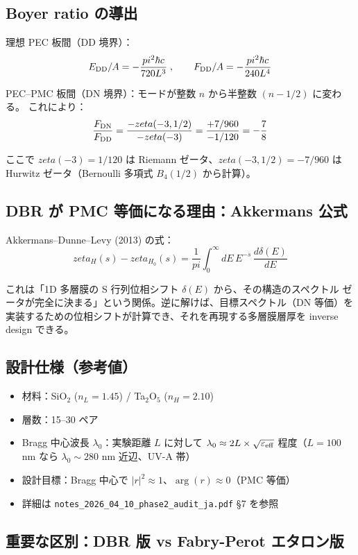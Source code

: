 \documentclass[11pt,a4paper]{article}
\def\pi{pi}%
\def\zeta{zeta}%
\begin{document}
\subsection{Boyer ratio の導出}

理想 PEC 板間（DD 境界）：
\[
  E_{\rm DD}/A = -\frac{\pi^2 \hbar c}{720 L^3}\;,\qquad F_{\rm DD}/A = -\frac{\pi^2 \hbar c}{240 L^4}
\]

PEC--PMC 板間（DN 境界）：モードが整数 $n$ から半整数 $(n-1/2)$ に変わる。
これにより：
\[
  \frac{F_{\rm DN}}{F_{\rm DD}} = \frac{-\zeta(-3,1/2)}{-\zeta(-3)}
                                = \frac{+7/960}{-1/120} = -\frac{7}{8}
\]

ここで $\zeta(-3) = 1/120$ は Riemann ゼータ、$\zeta(-3, 1/2) = -7/960$ は
Hurwitz ゼータ（Bernoulli 多項式 $B_4(1/2)$ から計算）。

\subsection{DBR が PMC 等価になる理由：Akkermans 公式}

Akkermans--Dunne--Levy (2013) の式：
\[
  \zeta_H(s) - \zeta_{H_0}(s) = \frac{1}{\pi}\int_0^\infty dE\,E^{-s}\,\frac{d\delta(E)}{dE}
\]

これは「1D 多層膜の S 行列位相シフト $\delta(E)$ から、その構造のスペクトル
ゼータが完全に決まる」という関係。逆に解けば、目標スペクトル（DN 等価）を
実装するための位相シフトが計算でき、それを再現する多層膜層厚を inverse design
できる。

\subsection{設計仕様（参考値）}

\begin{itemize}
\item 材料：SiO$_2$ ($n_L = 1.45$) / Ta$_2$O$_5$ ($n_H = 2.10$)
\item 層数：15--30 ペア
\item Bragg 中心波長 $\lambda_0$：実験距離 $L$ に対して $\lambda_0 \approx 2L \times \sqrt{\varepsilon_{\rm eff}}$
  程度（$L = 100$ nm なら $\lambda_0 \sim 280$ nm 近辺、UV-A 帯）
\item 設計目標：Bragg 中心で $|r|^2 \approx 1$、$\arg(r) \approx 0$（PMC 等価）
\item 詳細は \texttt{notes\_2026\_04\_10\_phase2\_audit\_ja.pdf} §7 を参照
\end{itemize}

\subsection{重要な区別：DBR 版 vs Fabry-Perot エタロン版}
\end{document}
